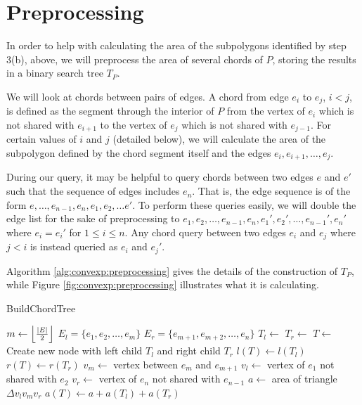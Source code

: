 \section{Preprocessing}
\label{:convexp:preprocessing}

In order to help with calculating the area of the subpolygons identified by step 3(b), above, we will preprocess the area of several chords of $P$, storing the results in a binary search tree $T_P$. 

We will look at chords between pairs of edges. 
A chord from edge $e_i$ to $e_j$, $i < j$, is defined as the segment through the interior of $P$ from the vertex of $e_i$ which is not shared with $e_{i+1}$ to the vertex of $e_j$ which is not shared with $e_{j-1}$.
For certain values of $i$ and $j$ (detailed below), we will calculate the area of the subpolygon defined by the chord segment itself and the edges $e_i, e_{i+1}, \ldots, e_j$.

During our query, it may be helpful to query chords between two edges $e$ and $e'$ such that the sequence of edges includes $e_n$.
That is, the edge sequence is of the form $e, \ldots, e_{n-1}, e_{n}, e_{1}, e_{2}, \ldots e'$.
To perform these queries easily, we will double the edge list for the sake of preprocessing to $e_1, e_2, \ldots, e_{n-1}, e_{n}, e_{1}', e_{2}', \ldots, e_{n-1}', e_n'$ where $e_i = e_i'$ for $1 \leq i \leq n$.
Any chord query between two edges $e_i$ and $e_j$ where $j < i$ is instead queried as $e_i$ and $e_j'$.

Algorithm \ref{alg:convexp:preprocessing} gives the details of the construction of $T_P$, while Figure \ref{fig:convexp:preprocessing} illustrates what it is calculating.

\begin{algorithm}
\LinesNumbered
\DontPrintSemicolon
\caption{BuildChordTree}
\label{alg:convexp:preprocessing}
\BlankLine
{}
$m \gets \left\lfloor\frac{|E|}{2}\right\rfloor$\;
$E_l = \{ e_1, e_2, \ldots, e_m \}$\;
$E_r = \{ e_{m+1}, e_{m+2}, \ldots, e_n \}$\;
$T_l \gets $ \;
$T_r \gets $ \;
$T \gets $ Create new node with left child $T_l$ and right child $T_r$\;
$l(T) \gets l(T_l)$\;
$r(T) \gets r(T_r)$\;
$v_m \gets $ vertex between $e_m$ and $e_{m+1}$\;
$v_l \gets $ vertex of $e_1$ not shared with $e_2$\;
$v_r \gets $ vertex of $e_n$ not shared with $e_{n-1}$\;
$a \gets $ area of triangle $\Delta v_l v_m v_r$\;
$a(T) \gets a + a(T_l) + a(T_r)$\;
\BlankLine
{}
\end{algorithm}


